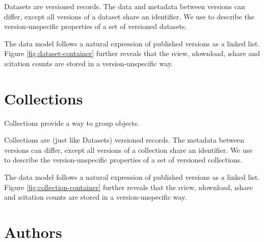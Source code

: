 
  Datasets are versioned records.  The data and metadata between versions
  can differ, except all versions of a dataset share an identifier.  We use
   to describe the version-unspecific properties
  of a set of versioned datasets.


  The data model follows a natural expression of published versions as a
  linked list.  Figure \ref{fig:dataset-container} further reveals that
  the \i{view}, \i{download}, \i{share} and \i{citation} counts are stored
  in a version-unspecific way.

\section{Collections}

  Collections provide a way to group  objects.


  Collections are (just like Datasets) versioned records.  The metadata between
  versions can differ, except all versions of a collection share an identifier.
  We use  to describe the version-unspecific
  properties of a set of versioned collections.


  The data model follows a natural expression of published versions as a
  linked list.  Figure \ref{fig:collection-container} further reveals that
  the \i{view}, \i{download}, \i{share} and \i{citation} counts are stored
  in a version-unspecific way.

\section{Authors}


